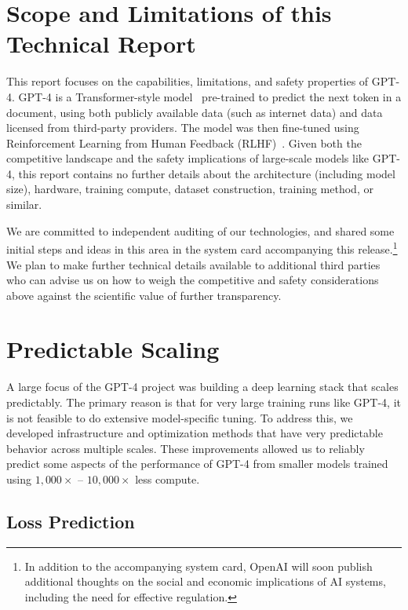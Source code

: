 \documentclass{article}
\begin{document}
\section{Scope and Limitations of this Technical Report}

This report focuses on the capabilities, limitations, and safety properties of GPT-4. GPT-4 is a Transformer-style model~\cite{vaswani2017attention} pre-trained to predict the next token in a document, using both publicly available data (such as internet data) and data licensed from third-party providers. The model was then fine-tuned using Reinforcement Learning from Human Feedback (RLHF)~\citep{christiano2017deep}. Given both the competitive landscape and the safety implications of large-scale models like GPT-4, this report contains no further details about the architecture (including model size), hardware, training compute, dataset construction, training method, or similar.

We are committed to independent auditing of our technologies, and shared some initial steps and ideas in this area in the system card accompanying this release.\footnote{In addition to the accompanying system card, OpenAI will soon publish additional thoughts on the social and economic implications of AI systems, including the need for effective regulation.} We plan to make further technical details available to additional third parties who can advise us on how to weigh the competitive and safety considerations above against the scientific value of further transparency.

\section{Predictable Scaling}

A large focus of the GPT-4 project was building a deep learning stack that scales predictably. The primary reason is that for very large training runs like GPT-4, it is not feasible to do extensive model-specific tuning. To address this, we developed infrastructure and optimization methods that have very predictable behavior across multiple scales. These improvements allowed us to reliably predict some aspects of the performance of GPT-4 from smaller models trained using $1,000\times$ -- $10,000\times$ less compute.

\subsection{Loss Prediction}
\end{document}

